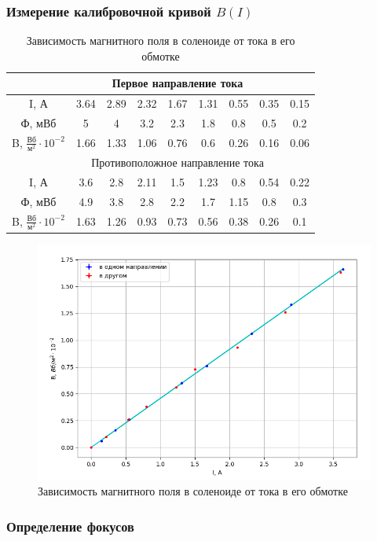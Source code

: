 \documentclass{article}
\begin{document}
\subsubsection*{Измерение калибровочной кривой $B(I)$}

\begin{table}[h]
    \centering
    \begin{tabular}{|c|c|c|c|c|c|c|c|c|}
    \hline
         & \multicolumn{7}{1}{Первое направление тока} & \\
    \hline
        I, А & 3.64 & 2.89 & 2.32 & 1.67 & 1.31 & 0.55 & 0.35 & 0.15  \\
    \hline
        Ф, мВб & 5 & 4 & 3.2 & 2.3 & 1.8 & 0.8 & 0.5 & 0.2 \\
    \hline
        B, $\frac{\text{Вб}}{\text{м}^2} \cdot 10^{-2}$ & 1.66 & 1.33 & 1.06 & 0.76 & 0.6 & 0.26 & 0.16 & 0.06 \\
    \hline
         & \multicolumn{7}{1}{Противоположное направление тока} & \\
    \hline
        I, А & 3.6 & 2.8 & 2.11 & 1.5 & 1.23 & 0.8 & 0.54 & 0.22 \\
    \hline
        Ф, мВб & 4.9 & 3.8 & 2.8 & 2.2 & 1.7 & 1.15 & 0.8 & 0.3 \\
    \hline
        B, $\frac{\text{Вб}}{\text{м}^2} \cdot 10^{-2}$ & 1.63 & 1.26 & 0.93 & 0.73 & 0.56 & 0.38 & 0.26 & 0.1 \\
    \hline
    \end{tabular}
    \caption{Зависимость магнитного поля в соленоиде от тока в его обмотке}
\end{table}

\begin{figure}[h]
    \centering
    \includegraphics[width=0.65\linewidth]{Screenshot_4.png}
    \caption{Зависимость магнитного поля в соленоиде от тока в его обмотке}
\end{figure}

\subsubsection*{Определение фокусов}
\end{document}
